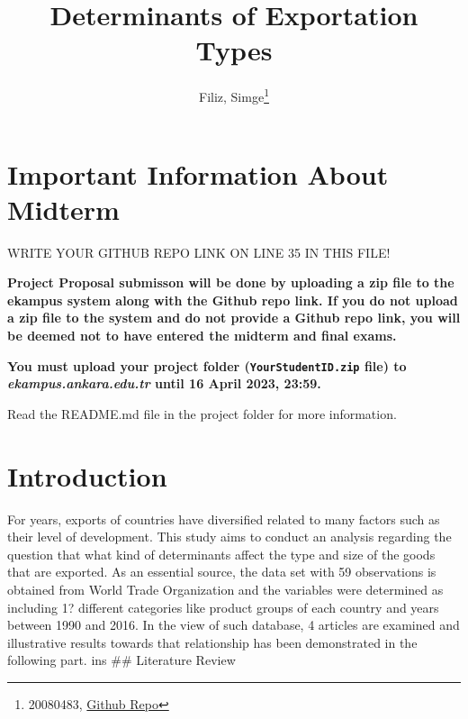 \documentclass[
  12pt,
]{article}
\title{Determinants of Exportation Types}
\author{Filiz, Simge\footnote{20080483, \href{https://github.com/simgefiliz/Midterm.git}{Github Repo}}}
\date{}
\begin{document}
\maketitle

\hypertarget{important-information-about-midterm}{%
\section{Important Information About Midterm}\label{important-information-about-midterm}}

\colorbox{BurntOrange}{WRITE YOUR GITHUB REPO LINK ON LINE 35 IN THIS FILE!}

\textbf{Project Proposal submisson will be done by uploading a zip file to the ekampus system along with the Github repo link. If you do not upload a zip file to the system and do not provide a Github repo link, you will be deemed not to have entered the midterm and final exams.}

\textbf{You must upload your project folder (\texttt{YourStudentID.zip} file) to \emph{ekampus.ankara.edu.tr} until 16 April 2023, 23:59.}

\colorbox{WildStrawberry}{Read the README.md file in the project folder for more information.}

\hypertarget{introduction}{%
\section{Introduction}\label{introduction}}

For years, exports of countries have diversified related to many factors such as their level of development. This study aims to conduct an analysis regarding the question that what kind of determinants affect the type and size of the goods that are exported. As an essential source, the data set with 59 observations is obtained from World Trade Organization and the variables were determined as including 1? different categories like product groups of each country and years between 1990 and 2016. In the view of such database, 4 articles are examined and illustrative results towards that relationship has been demonstrated in the following part.
ins
\#\# Literature Review
\end{document}
